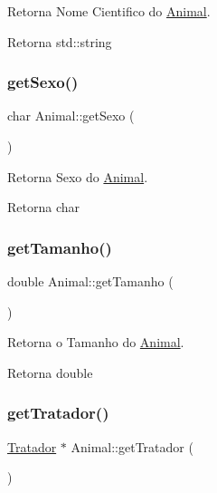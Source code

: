 Retorna Nome Cientifico do \hyperlink{classAnimal}{Animal}. 

\begin{DoxyReturn}{Retorna}
std\+::string 
\end{DoxyReturn}
\mbox{\label{classAnimal_a7349027418d900a9cd7cfc32001b6f7d}} 
\subsubsection{\texorpdfstring{get\+Sexo()}{getSexo()}}
{\footnotesize\ttfamily char Animal\+::get\+Sexo (\begin{DoxyParamCaption}{ }\end{DoxyParamCaption})}



Retorna Sexo do \hyperlink{classAnimal}{Animal}. 

\begin{DoxyReturn}{Retorna}
char 
\end{DoxyReturn}
\mbox{\label{classAnimal_a3936ff4ad07fee3173db2a9dff52c706}} 
\subsubsection{\texorpdfstring{get\+Tamanho()}{getTamanho()}}
{\footnotesize\ttfamily double Animal\+::get\+Tamanho (\begin{DoxyParamCaption}{ }\end{DoxyParamCaption})}



Retorna o Tamanho do \hyperlink{classAnimal}{Animal}. 

\begin{DoxyReturn}{Retorna}
double 
\end{DoxyReturn}
\mbox{\label{classAnimal_a386807706a0ba203fe84b68cd10c38aa}} 
\subsubsection{\texorpdfstring{get\+Tratador()}{getTratador()}}
{\footnotesize\ttfamily \hyperlink{classTratador}{Tratador} $\ast$ Animal\+::get\+Tratador (\begin{DoxyParamCaption}{ }\end{DoxyParamCaption})}



